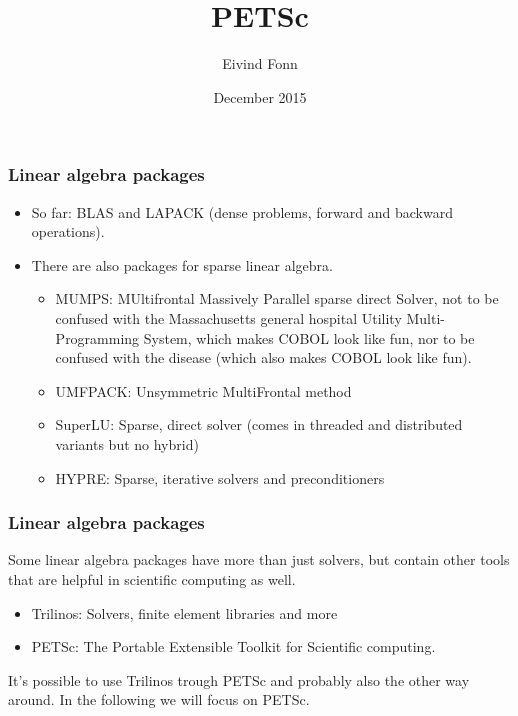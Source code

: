 

\title{PETSc}
\author{Eivind Fonn}
\date{December 2015}
\maketitle

\begin{frame}
  \frametitle{Linear algebra packages}
  \begin{itemize}
  \item So far: BLAS and LAPACK (dense problems, forward and backward
    operations).
  \item There are also packages for sparse linear algebra.
    \begin{itemize}
    \item MUMPS: MUltifrontal Massively Parallel sparse direct Solver, not to be
      confused with the Massachusetts general hospital Utility Multi-Programming
      System, which makes COBOL look like fun, nor to be confused with the
      disease (which also makes COBOL look like fun).
    \item UMFPACK: Unsymmetric MultiFrontal method
    \item SuperLU: Sparse, direct solver (comes in threaded and distributed
      variants but no hybrid)
    \item HYPRE: Sparse, iterative solvers and preconditioners
    \end{itemize}
  \end{itemize}
\end{frame}

\begin{frame}
  \frametitle{Linear algebra packages}
  Some linear algebra packages have more than just solvers, but contain other
  tools that are helpful in scientific computing as well.
  \begin{itemize}
  \item Trilinos: Solvers, finite element libraries and more
  \item PETSc: The Portable Extensible Toolkit for Scientific computing.
  \end{itemize}
  It's possible to use Trilinos trough PETSc and probably also the other way
  around. In the following we will focus on PETSc.
\end{frame}

